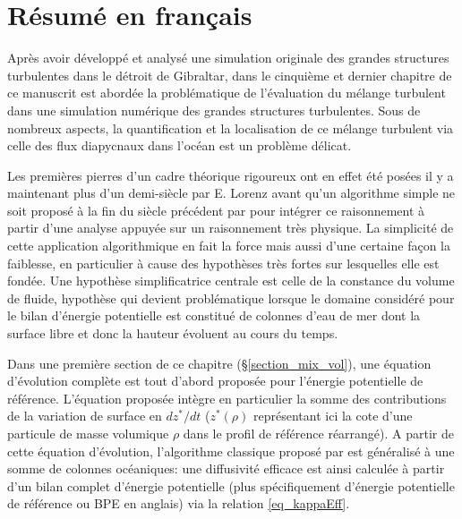 \vspace{-1.\baselineskip}
\section{Résumé en français}
Après avoir développé et analysé une simulation originale des grandes structures turbulentes dans le détroit de Gibraltar, dans le cinquième et dernier chapitre de ce manuscrit est abordée la problématique de l'évaluation du mélange turbulent dans une simulation numérique des grandes structures turbulentes. Sous de nombreux aspects, la quantification et la localisation de ce mélange turbulent via celle des flux diapycnaux dans l'océan est un problème délicat.

Les premières pierres d'un cadre théorique rigoureux ont en effet été posées il y a maintenant plus d'un demi-siècle par E. Lorenz \citep{lorenz_available_1955} avant qu'un algorithme simple ne soit proposé à la fin du siècle précédent par \cite{winters_available_1995} pour intégrer ce raisonnement à partir d'une analyse appuyée sur un raisonnement très physique. La simplicité de cette application algorithmique en fait la force mais aussi d'une certaine façon la faiblesse, en particulier à cause des hypothèses très fortes sur lesquelles elle est fondée. Une hypothèse simplificatrice centrale est celle de la constance du volume de fluide, hypothèse qui devient problématique lorsque le domaine considéré pour le bilan d'énergie potentielle est constitué de colonnes d'eau de mer dont la surface libre et donc la hauteur évoluent au cours du temps.

Dans une première section de ce chapitre (\S \ref{section_mix_vol}), une équation d'évolution complète est tout d'abord proposée pour l'énergie potentielle de référence. L'équation proposée intègre en particulier la somme des contributions de la variation de surface en $dz^*/dt$ ($z^*(\rho)$ représentant ici la cote d'une particule de masse volumique $\rho$ dans le profil de référence réarrangé). A partir de cette équation d'évolution, l'algorithme classique proposé par \cite{winters_available_1995} est généralisé à une somme de colonnes océaniques: une diffusivité efficace est ainsi calculée à partir d'un bilan complet d'énergie potentielle (plus spécifiquement d'énergie potentielle de référence ou BPE en anglais) via la relation \ref{eq_kappaEff}.


